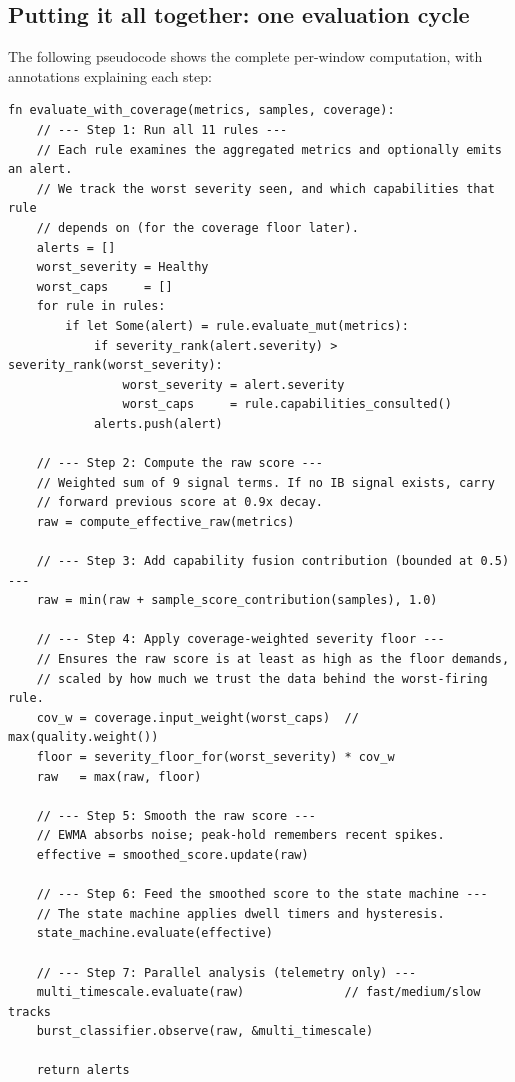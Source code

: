 \documentclass[11pt]{article}
\begin{document}
\subsection{Putting it all together: one evaluation cycle}

The following pseudocode shows the complete per-window computation, with
annotations explaining each step:

\begin{lstlisting}[caption={Complete evaluation pseudocode (detection/mod.rs)}]
fn evaluate_with_coverage(metrics, samples, coverage):
    // --- Step 1: Run all 11 rules ---
    // Each rule examines the aggregated metrics and optionally emits an alert.
    // We track the worst severity seen, and which capabilities that rule
    // depends on (for the coverage floor later).
    alerts = []
    worst_severity = Healthy
    worst_caps     = []
    for rule in rules:
        if let Some(alert) = rule.evaluate_mut(metrics):
            if severity_rank(alert.severity) > severity_rank(worst_severity):
                worst_severity = alert.severity
                worst_caps     = rule.capabilities_consulted()
            alerts.push(alert)

    // --- Step 2: Compute the raw score ---
    // Weighted sum of 9 signal terms. If no IB signal exists, carry
    // forward previous score at 0.9x decay.
    raw = compute_effective_raw(metrics)

    // --- Step 3: Add capability fusion contribution (bounded at 0.5) ---
    raw = min(raw + sample_score_contribution(samples), 1.0)

    // --- Step 4: Apply coverage-weighted severity floor ---
    // Ensures the raw score is at least as high as the floor demands,
    // scaled by how much we trust the data behind the worst-firing rule.
    cov_w = coverage.input_weight(worst_caps)  // max(quality.weight())
    floor = severity_floor_for(worst_severity) * cov_w
    raw   = max(raw, floor)

    // --- Step 5: Smooth the raw score ---
    // EWMA absorbs noise; peak-hold remembers recent spikes.
    effective = smoothed_score.update(raw)

    // --- Step 6: Feed the smoothed score to the state machine ---
    // The state machine applies dwell timers and hysteresis.
    state_machine.evaluate(effective)

    // --- Step 7: Parallel analysis (telemetry only) ---
    multi_timescale.evaluate(raw)              // fast/medium/slow tracks
    burst_classifier.observe(raw, &multi_timescale)

    return alerts
\end{lstlisting}
\end{document}
